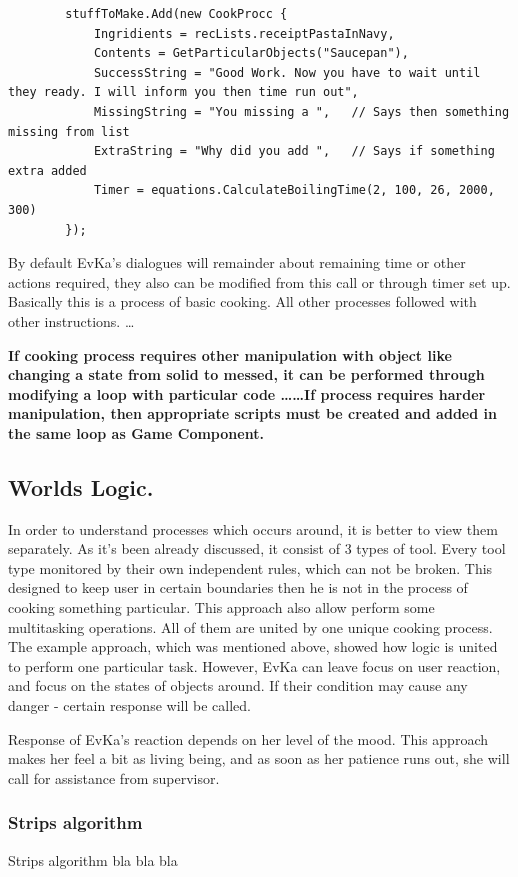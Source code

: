 \documentclass[18pt]{article}
\numberwithin{equation}{section} %
\numberwithin{figure}{section} %
\numberwithin{table}{section} %
\begin{document}
		\lstset{style=sharpc}
		\begin{lstlisting}
		stuffToMake.Add(new CookProcc {
			Ingridients = recLists.receiptPastaInNavy,
			Contents = GetParticularObjects("Saucepan"),
			SuccessString = "Good Work. Now you have to wait until they ready. I will inform you then time run out",
			MissingString = "You missing a ",	// Says then something missing from list
			ExtraString = "Why did you add ",	// Says if something extra added
			Timer = equations.CalculateBoilingTime(2, 100, 26, 2000, 300)
		});
		\end{lstlisting}
		
		By default EvKa's dialogues will remainder about remaining time or other actions required, they also can be modified from this call or through timer set up. Basically this is a process of basic cooking. All other processes followed with other instructions. \ldots
		
		\textbf{If cooking process requires other manipulation with object like changing a state from solid to messed, it can be performed through modifying a loop with particular code \ldots \ldots If process requires harder manipulation, then appropriate scripts must be created and added in the same loop as Game Component. }
		
	\subsection{Worlds Logic.}
		In order to understand processes which occurs around, it is better to view them separately. As it's been already discussed, it consist of 3 types of tool. Every tool type monitored by their own independent rules, which can not be broken. This designed to keep user in certain boundaries then he is not in the process of cooking something particular. This approach also allow perform some multitasking operations. All of them are united by one unique cooking process. The example approach, which was mentioned above, showed how logic is united to perform one particular task. However, EvKa can leave focus on user reaction, and focus on the states of objects around. If their condition may cause any danger - certain response will be called.
		
		Response of EvKa's reaction depends on her level of the mood. This approach makes her feel a bit as living being, and as soon as her patience runs out, she will call for assistance from supervisor.
		
	\subsubsection{Strips algorithm}
	Strips algorithm bla bla bla~\cite{STRIPS}
\end{document}
